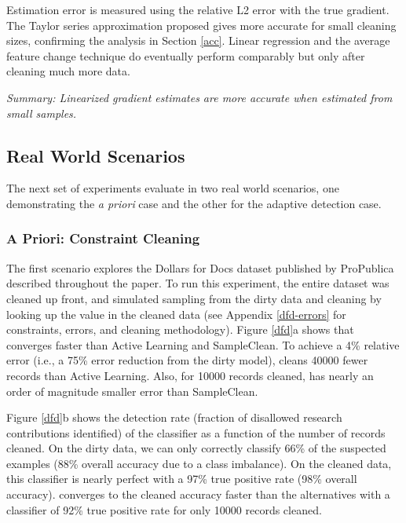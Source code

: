 Estimation error is measured using the relative L2 error with the true gradient.
The Taylor series approximation proposed gives more accurate for small cleaning sizes, confirming the analysis in Section \ref{acc}.
Linear regression and the average feature change technique do eventually perform comparably but only after cleaning much more data.

\vspace{0.25em}

\noindent \emph{Summary: Linearized gradient estimates are more accurate when estimated from small samples. }

\subsection{Real World Scenarios}
The next set of experiments evaluate \sys in two real world scenarios, one demonstrating the \emph{a priori} case and the other for the adaptive detection case.

\subsubsection{A Priori: Constraint Cleaning}\label{dfd-exp}
The first scenario explores the Dollars for Docs dataset published by ProPublica described throughout the paper.
To run this experiment, the entire dataset was cleaned up front, and simulated sampling from the dirty data and cleaning by looking up the value in the cleaned data (see Appendix \ref{dfd-errors} for constraints, errors, and cleaning methodology).
Figure \ref{dfd}a shows that \sys converges faster than Active Learning and SampleClean.
To achieve a 4\% relative error (i.e., a 75\% error reduction from the dirty model), \sys cleans 40000 fewer records than Active Learning.
Also, for 10000 records cleaned, \sys has nearly an order of magnitude smaller error than SampleClean.

Figure \ref{dfd}b shows the detection rate (fraction of disallowed research contributions identified) of the classifier as a function of the number of records cleaned. 
On the dirty data, we can only correctly classify 66\% of the suspected examples (88\% overall accuracy due to a class imbalance).
On the cleaned data, this classifier is nearly perfect with a 97\% true positive rate (98\% overall accuracy).
\sys converges to the cleaned accuracy faster than the alternatives with a classifier of 92\% true positive rate for only 10000 records cleaned.

\vspace{0.25em}

